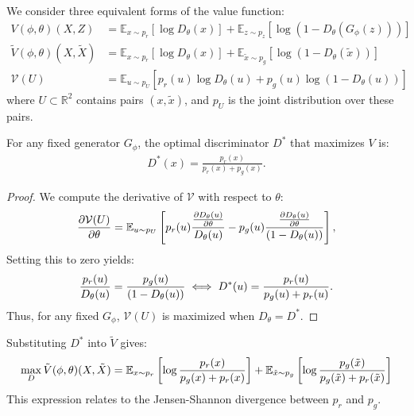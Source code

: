 We consider three equivalent forms of the value function:
\begin{align}
  V(\phi, \theta)(X, Z) & = \mathbb{E}_{x \sim p_r}[\log D_\theta(x)] + \mathbb{E}_{z \sim p_z}[\log(1 - D_\theta(G_\phi(z)))] \\
  \tilde{V}(\phi, \theta)(X, \tilde{X}) & = \mathbb{E}_{x \sim p_r}[\log D_\theta(x)] + \mathbb{E}_{\tilde{x} \sim p_g}[\log(1 - D_\theta(\tilde{x}))] \\
  \mathcal{V}(U) & = \mathbb{E}_{u \sim p_U} [p_r(u) \log D_\theta(u) + p_g(u) \log(1 - D_\theta(u))]
\end{align}
where $U \subset \mathbb{R}^2$ contains pairs $(x, \tilde{x})$, and $p_U$ is the joint distribution over these pairs.

\begin{theorem}%
 \label{theorem:minimax}
 For any fixed generator $G_\phi$, the optimal discriminator $D^*$ that maximizes $V$ is:
  \begin{align}
    D^*(x) = \frac{p_r(x)}{p_r(x) + p_g(x)}.
  \end{align}
\end{theorem}
\begin{proof}
  We compute the derivative of $\mathcal{V}$ with respect to $\theta$:
  \begin{align}
    \label{eq:derivatives}
    {\partial \mathcal{V}(U) \over \partial \theta} = \mathbb{E}_{u \sim p_U}\left[ p_r(u) { {\partial D_\theta(u) \over \partial \theta} \over D_\theta(u)} - p_g(u) {{\partial D_\theta(u) \over \partial \theta} \over (1 - D_\theta(u))}\right],
  \end{align}
  Setting this to zero yields:
  \begin{align}
    \label{eq:20}
    {p_r(u) \over D_\theta(u)} = {p_g(u) \over (1 - D_\theta(u))} \iff D^*(u) = {p_r(u) \over p_g(u) + p_r(u)}.
  \end{align}
  Thus, for any fixed $G_\phi$, $\mathcal{V}(U)$ is maximized when $D_\theta = D^*$.
\end{proof}

Substituting $D^*$ into $\tilde{V}$ gives:
\begin{align}
  \label{eq:sum-of-two-kl-divergences}
   \max_D \tilde{V}(\phi, \theta)(X, \tilde{X}) = \mathbb{E}_{x \sim p_r}\left[\log{p_r(x) \over p_g(x) + p_r(x)}\right] + \mathbb{E}_{\tilde{x} \sim p_g}\left[\log{p_g(\tilde{x}) \over p_g(\tilde{x}) + p_r(\tilde{x})} \right]
\end{align}
This expression relates to the Jensen-Shannon divergence between $p_r$ and $p_g$.

